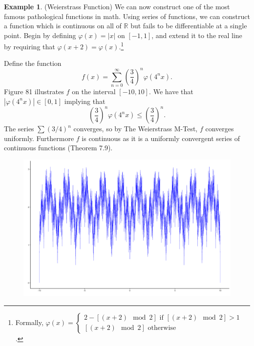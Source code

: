 \documentclass{article}
\newcommand{\R}{\mathbb{R}}
\theoremstyle{definition}
\newtheorem{example}{Example}[section]
\begin{document}
	
	\begin{example}(Weierstrass Function)
		We can now construct one of the most famous pathological functions in math. Using series of functions, we can construct a function which is continuous on all of $ \R $ but fails to be differentiable at a single point. Begin by defining $ \varphi(x)=|x|$ on $ [-1,1] $, and extend it to the real line by requiring that $ \varphi(x+2)=\varphi(x) $.\footnote{Formally, $ \varphi(x)= \begin{cases}
				2 - [(x+2) \mod 2]\text{ if }[(x+2) \mod 2] > 1\\
				[(x+2) \mod 2] \text{ otherwise}
			\end{cases} $.}
		
		Define the function 
		$$ f(x) = \sum_{n=0}^{\infty}\left(\frac{3}{4}\right)^n\varphi(4^nx).$$ Figure 81 illustrates $ f $ on the interval $ [-10,10] $. We have that $ |\varphi(4^nx)|\in[0,1] $ implying that $$ \left(\frac{3}{4}\right)^n\varphi(4^nx) \le \left(\frac{3}{4}\right)^n .$$ The series $\sum (3/4)^n $ converges, so by The Weierstrass M-Test, $ f $ converges uniformly. Furthermore $ f $ is continuous as it is a uniformly convergent series of continuous functions (Theorem 7.9). 
		
		\begin{figure}[h!]
			\centering
			\includegraphics[width=0.9\linewidth]{figures/weierstrass}
			\caption{}
			\label{fig:weierstrass}
		\end{figure}
		

\end{example}
\end{document}
